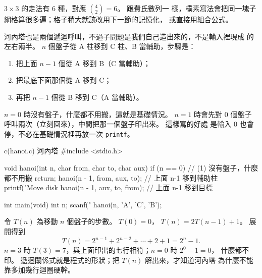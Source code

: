 
$3 \times 3$ 的走法有 $6$ 種，對應 $\binom{4}{2} = 6$。 跟費氏數列一
樣，樸素寫法會把同一塊子網格算很多遍；格子稍大就該改用下一節的記憶化，
或直接用組合公式。

河內塔也是兩個遞迴呼叫，不過子問題是我們自己造出來的，不是輸入裡現成
的左右兩半。 $n$ 個盤子從 A 柱移到 C 柱、B 當輔助，步驟是：

\begin{enumerate}
\item 把上面 $n-1$ 個從 A 移到 B（C 當輔助）；
\item 把最底下面那個從 A 移到 C；
\item 再把 $n-1$ 個從 B 移到 C（A 當輔助）。
\end{enumerate}

$n = 0$ 時沒有盤子，什麼都不用搬，這就是基礎情況。 $n = 1$ 時會先對
$0$ 個盤子呼叫兩次（立刻回來），中間把那一個盤子印出來。 這樣寫的好處
是輸入 $0$ 也會停，不必在基礎情況裡再放一次 \texttt{printf}。

\begin{example}{c}{(hanoi.c) 河內塔}
#include <stdio.h>

void hanoi(int n, char from, char to, char aux) {
    if (n == 0) {              // (1) 沒有盤子，什麼都不用搬
        return;
    }
    hanoi(n - 1, from, aux, to);                         // 上面 n-1 移到輔助柱
    printf("Move disk %
    hanoi(n - 1, aux, to, from);                         // 上面 n-1 移到目標
}

int main(void) {
    int n;
    scanf("%
    hanoi(n, 'A', 'C', 'B');
}
\end{example}


令 $T(n)$ 為移動 $n$ 個盤子的步數。 $T(0) = 0$，
$T(n) = 2T(n-1) + 1$。 展開得到
\[
T(n) = 2^{n-1} + 2^{n-2} + \cdots + 2 + 1 = 2^n - 1.
\]
$n = 3$ 時 $T(3) = 7$，與上面印出的七行相符；$n = 0$ 時 $2^0 - 1 = 0$，
什麼都不印。 遞迴關係式就是程式的形狀；把 $T(n)$ 解出來，才知道河內塔
為什麼不能靠多加幾行迴圈硬幹。

